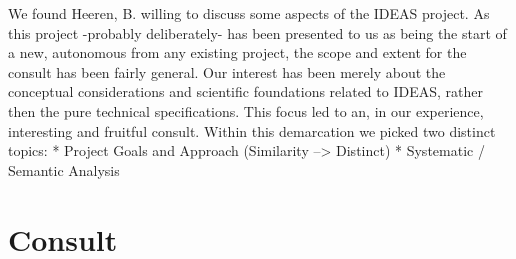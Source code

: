 We found Heeren, B. willing to discuss some aspects of the IDEAS project. As 
this project -probably deliberately- has been presented to us as being the 
start of a new, autonomous from any existing project, the scope and extent for
the consult has been fairly general. Our interest has been merely about the 
conceptual considerations and scientific foundations related to IDEAS, 
rather then the pure technical specifications. This focus led to an, in our
experience, interesting and fruitful consult. Within this demarcation we picked
two distinct topics: 
	* Project Goals and Approach (Similarity --> Distinct)
	* Systematic / Semantic Analysis 

\section{Consult}



